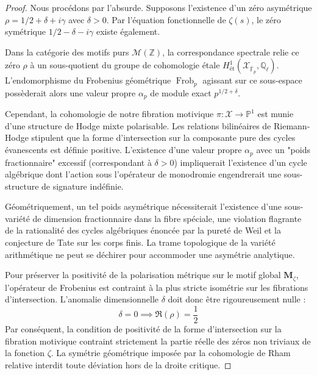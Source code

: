 \documentclass[
]{article}
\begin{document}
\begin{proof}
Nous procédons par l'absurde. Supposons l'existence d'un zéro asymétrique $\rho = 1/2 + \delta + i\gamma$ avec $\delta > 0$. Par l'équation fonctionnelle de $\zeta(s)$, le zéro symétrique $1/2 - \delta - i\gamma$ existe également.

Dans la catégorie des motifs purs $\mathcal{M}(\mathbb{Z})$, la correspondance spectrale relie ce zéro $\rho$ à un sous-quotient du groupe de cohomologie étale $H^1_{\text{ét}}(\mathcal{X}_{\bar{\mathbb{F}}_p}, \mathbb{Q}_{\ell})$. L'endomorphisme du Frobenius géométrique $\operatorname{Frob}_p$ agissant sur ce sous-espace possèderait alors une valeur propre $\alpha_p$ de module exact $p^{1/2 + \delta}$.

Cependant, la cohomologie de notre fibration motivique $\pi : \mathcal{X} \to \mathbb{P}^1$ est munie d'une structure de Hodge mixte polarisable. Les relations bilinéaires de Riemann-Hodge stipulent que la forme d'intersection sur la composante pure des cycles évanescents est définie positive. L'existence d'une valeur propre $\alpha_p$ avec un "poids fractionnaire" excessif (correspondant à $\delta > 0$) impliquerait l'existence d'un cycle algébrique dont l'action sous l'opérateur de monodromie engendrerait une sous-structure de signature indéfinie.

Géométriquement, un tel poids asymétrique nécessiterait l'existence d'une sous-variété de dimension fractionnaire dans la fibre spéciale, une violation flagrante de la rationalité des cycles algébriques énoncée par la pureté de Weil et la conjecture de Tate sur les corps finis. La trame topologique de la variété arithmétique ne peut se déchirer pour accommoder une asymétrie analytique.

Pour préserver la positivité de la polarisation métrique sur le motif global $\mathbf{M}_{\zeta}$, l'opérateur de Frobenius est contraint à la plus stricte isométrie sur les fibrations d'intersection. L'anomalie dimensionnelle $\delta$ doit donc être rigoureusement nulle :
\begin{equation*}
\delta = 0 \implies \Re(\rho) = \frac{1}{2}
\end{equation*}
Par conséquent, la condition de positivité de la forme d'intersection sur la fibration motivique contraint strictement la partie réelle des zéros non triviaux de la fonction $\zeta$. La symétrie géométrique imposée par la cohomologie de Rham relative interdit toute déviation hors de la droite critique.
\end{proof}
\end{document}
